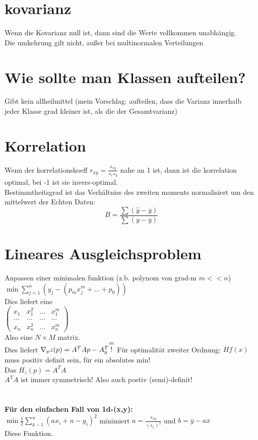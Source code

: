 \documentclass{article}
\begin{document}
	\section{kovarianz}
	Wenn die Kovarianz null ist, dann sind die Werte vollkommen unabhängig.\\
	Die umkehrung gilt nicht, außer bei multinormalen Verteilungen
	\section{Wie sollte man Klassen aufteilen?}
	Gibt kein allheilmittel (mein Vorschlag: aufteilen, dass die Varianz innerhalb jeder Klasse grad kleiner ist, als die der Gesamtvarianz)
	\section{Korrelation}
	Wenn der korrelationskoeff $r_{xy} = \frac{s_{xy}}{s_xs_y}$ nahe an 1 ist, dann ist die korrelation optimal, bei -1 ist sie invers-optimal.\\
	Bestimmtheitsgrad ist das Verhältniss des zweiten moments normalisiert um den mittelwert der Echten Daten:\\
	\[B = \frac{\sum(\hat{y}-\overline{y})}{\sum(y-\overline{y})}\]
	\section{Lineares Ausgleichsproblem}
	Anpassen einer minimalen funktion (z.b. polynom von grad-m $m<<n$)\\
	$\min\sum\limits^n_{j=1} (y_j-(p_mx_j^m+\dots +p_0))$\\
	Dies liefert eine\\
	$\begin{pmatrix}
	x_1&x_1^2&\dots&x_1^m\\
	\dots&\dots&\dots&\dots\\
	x_n&x_n^2&\dots&x_n^m
	\end{pmatrix}$\\
	Also eine $N\times M$ matrix.\\
	Dies liefert $\nabla_p z(p)=A^TAp-A^T_y\stackon{!}{=}$
	Für optimalität zweiter Ordnung: $Hf(x)$ muss positiv definit sein, für ein absolutes min!\\
	Das $H_z(p)=A^TA$\\
	$A^TA$ ist immer symmetrisch! Also auch postiv (semi)-definit!\\
	\\
	\\
	\textbf{Für den einfachen Fall von 1d-(x,y):\\}
	$\min \frac{1}{2}\sum\limits^n_{k-1}(ax_i+n-y_i)^2$
	minimiert $a=\frac{s_{xy}}{(s_x)^2}$ und $b=\overline{y}-a\overline{x}$\\
	Diese Funktion.\\
\end{document}
